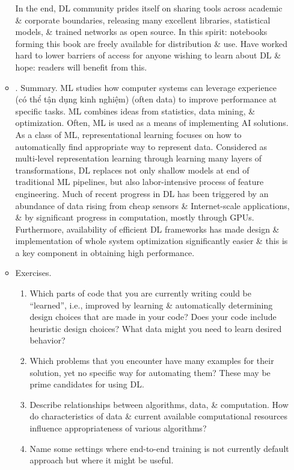 \documentclass{article}
\begin{document}
\begin{itemize}
\begin{itemize}
		In the end, DL community prides itself on sharing tools across academic \& corporate boundaries, releasing many excellent libraries, statistical models, \& trained networks as open source. In this spirit: notebooks forming this book are freely available for distribution \& use. Have worked hard to lower barriers of access for anyone wishing to learn about DL \& hope: readers will benefit from this.
		\item {. Summary.} ML studies how computer systems can leverage experience (có thể tận dụng kinh nghiệm) (often data) to improve performance at specific tasks. ML combines ideas from statistics, data mining, \& optimization. Often, ML is used as a means of implementing AI solutions. As a class of ML, representational learning focuses on how to automatically find appropriate way to represent data. Considered as multi-level representation learning through learning many layers of transformations, DL replaces not only shallow models at end of traditional ML pipelines, but also labor-intensive process of feature engineering. Much of recent progress in DL has been triggered by an abundance of data rising from cheap sensors \& Internet-scale applications, \& by significant progress in computation, mostly through GPUs. Furthermore, availability of efficient DL frameworks has made design \& implementation of whole system optimization significantly easier \& this is a key component in obtaining high performance.
		\item {\sf Exercises.}
		\begin{enumerate}
			\item Which parts of code that you are currently writing could be ``learned'', i.e., improved by learning \& automatically determining design choices that are made in your code? Does your code include heuristic design choices? What data might you need to learn desired behavior?
			\item Which problems that you encounter have many examples for their solution, yet no specific way for automating them? These may be prime candidates for using DL.
			\item Describe relationships between algorithms, data, \& computation. How do characteristics of data \& current available computational resources influence appropriateness of various algorithms?
			\item Name some settings where end-to-end training is not currently default approach but where it might be useful.
		\end{enumerate}
	\end{itemize}

\end{itemize}
\end{document}
